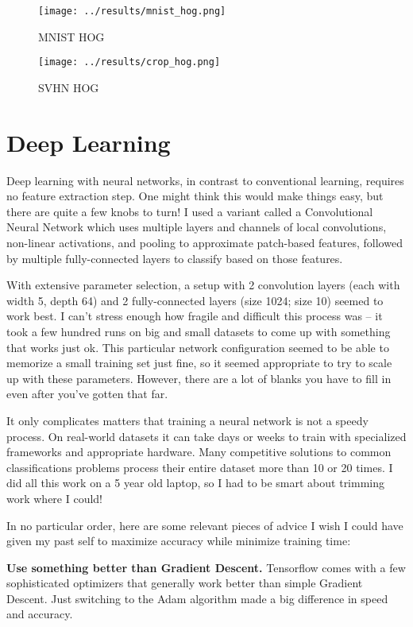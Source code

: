 \documentclass{article}
\begin{document}
\begin{figure}[htbp]
  \centering
  \texttt{[image: ../results/mnist\_hog.png]}
  \caption{MNIST HOG}
  \label{fig:mnist_hog}
\end{figure}

\begin{figure}[htbp]
  \centering
  \texttt{[image: ../results/crop\_hog.png]}
  \caption{SVHN HOG}
  \label{fig:svhn_hog}
\end{figure}

\section{Deep Learning}

Deep learning with neural networks, in contrast to conventional learning, requires no feature extraction step. One might think this would make things easy, but there are quite a few knobs to turn! I used a variant called a Convolutional Neural Network which uses multiple layers and channels of local convolutions, non-linear activations, and pooling to approximate patch-based features, followed by multiple fully-connected layers to classify based on those features.

With extensive parameter selection, a setup with 2 convolution layers (each with width 5, depth 64) and 2 fully-connected layers (size 1024; size 10) seemed to work best. I can't stress enough how fragile and difficult this process was -- it took a few hundred runs on big and small datasets to come up with something that works just ok. This particular network configuration seemed to be able to memorize a small training set just fine, so it seemed appropriate to try to scale up with these parameters. However, there are a lot of blanks you have to fill in even after you've gotten that far.

It only complicates matters that training a neural network is not a speedy process. On real-world datasets it can take days or weeks to train with specialized frameworks and appropriate hardware. Many competitive solutions to common classifications problems process their entire dataset more than 10 or 20 times. I did all this work on a 5 year old laptop, so I had to be smart about trimming work where I could!

In no particular order, here are some relevant pieces of advice I wish I could have given my past self to maximize accuracy while minimize training time:

\textbf{Use something better than Gradient Descent.} Tensorflow comes with a few sophisticated optimizers that generally work better than simple Gradient Descent. Just switching to the Adam algorithm made a big difference in speed and accuracy.
\end{document}
